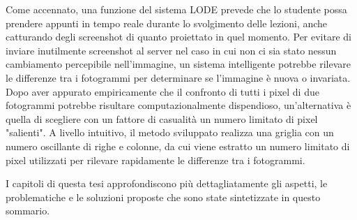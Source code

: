 Come accennato, una funzione del sistema LODE prevede che lo studente possa prendere appunti in tempo reale durante lo svolgimento delle lezioni, anche catturando degli screenshot di quanto proiettato in quel momento. Per evitare di inviare inutilmente screenshot al server nel caso in cui non ci sia stato nessun cambiamento percepibile nell'immagine, un sistema intelligente potrebbe rilevare le differenze tra i fotogrammi per determinare se l'immagine è nuova o invariata. Dopo aver appurato empiricamente che il confronto di tutti i pixel di due fotogrammi potrebbe risultare computazionalmente dispendioso, un'alternativa è quella di scegliere con un fattore di casualità un numero limitato di pixel "salienti". A livello intuitivo, il metodo sviluppato realizza una griglia con un numero oscillante di righe e colonne, da cui viene estratto un numero limitato di pixel utilizzati per rilevare rapidamente le differenze tra i fotogrammi.

I capitoli di questa tesi approfondiscono più dettagliatamente gli aspetti, le problematiche e le soluzioni proposte che sono state sintetizzate in questo sommario.


